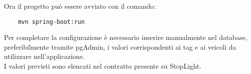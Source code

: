 \noindent
Ora il progetto può essere avviato con il comando:
\begin{lstlisting}
    mvn spring-boot:run
\end{lstlisting}

\noindent
Per completare la configurazione è necessario inserire manualmente nel database, preferibilmente tramite pgAdmin, i valori corrispondenti ai tag e ai veicoli da utilizzare nell'applicazione.\\
I valori previsti sono elencati nel contratto presente su StopLight.